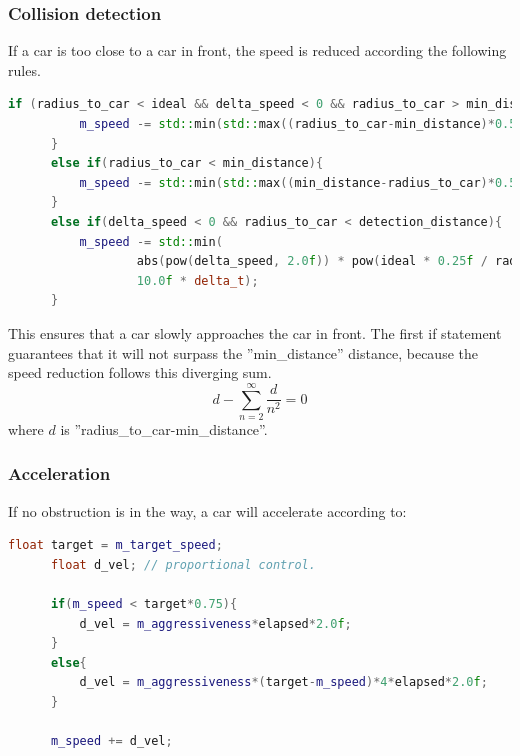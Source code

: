 \documentclass{article}
\begin{document}
    \subsubsection{Collision detection}
      If a car is too close to a car in front, the speed is reduced according the following rules.
      \begin{lstlisting}[language=C++]
      if (radius_to_car < ideal && delta_speed < 0 && radius_to_car > min_distance) {
          m_speed -= std::min(std::max((radius_to_car-min_distance)*0.5f,0.0f),10.0f*delta_t);
      }
      else if(radius_to_car < min_distance){
          m_speed -= std::min(std::max((min_distance-radius_to_car)*0.5f,0.0f),2.0f*delta_t);
      }
      else if(delta_speed < 0 && radius_to_car < detection_distance){
          m_speed -= std::min(
                  abs(pow(delta_speed, 2.0f)) * pow(ideal * 0.25f / radius_to_car, 2.0f) * m_aggressiveness * 0.15f,
                  10.0f * delta_t);
      }
      \end{lstlisting}
      This ensures that a car slowly approaches the car in front. The first if statement
      guarantees that it will not surpass the ''min\_distance'' distance, because the
      speed reduction follows this diverging sum.
      \begin{equation}
        d - \sum_{n = 2}^{\infty} \frac{d}{n^{2}} = 0
      \end{equation}
      where $d$ is ''radius\_to\_car-min\_distance''.
    \subsubsection{Acceleration}
      If no obstruction is in the way, a car will accelerate according to:
      \begin{lstlisting}[language=C++]
      float target = m_target_speed;
      float d_vel; // proportional control.

      if(m_speed < target*0.75){
          d_vel = m_aggressiveness*elapsed*2.0f;
      }
      else{
          d_vel = m_aggressiveness*(target-m_speed)*4*elapsed*2.0f;
      }

      m_speed += d_vel;
      \end{lstlisting}
\end{document}
